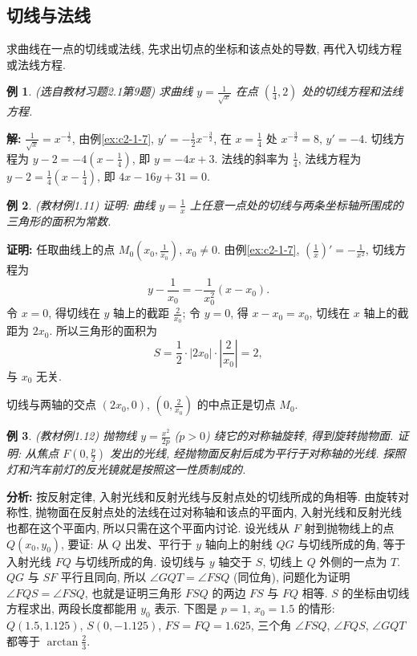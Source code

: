 \documentclass[UTF8,openany]{ctexbook}
\theoremstyle{chinesetextbook}
\newtheorem{example}{例}[section]
\newenvironment{cnproof}{\par\indent\textbf{证明:} \ignorespaces}{\par}
\newenvironment{cnsolution}{\par\indent\textbf{解:} \ignorespaces}{\par}
\begin{document}
\subsection{切线与法线}
求曲线在一点的切线或法线, 先求出切点的坐标和该点处的导数, 再代入切线方程或法线方程.
\begin{example}\label{ex:c2-h1-9}
\textnormal{(选自教材习题2.1第9题)} 求曲线 $\displaystyle y=\frac1{\sqrt x}$ 在点 $\displaystyle\left(\frac14,2\right)$ 处的切线方程和法线方程.
\end{example}
\begin{cnsolution}
$\displaystyle\frac1{\sqrt x}=x^{-\frac12}$, 由例\ref{ex:c2-1-7}, $\displaystyle y'=-\frac12x^{-\frac32}$, 在 $\displaystyle x=\frac14$ 处 $x^{-\frac32}=8$, $y'=-4$. 切线方程为 $\displaystyle y-2=-4\left(x-\frac14\right)$, 即 $y=-4x+3$. 法线的斜率为 $\displaystyle\frac14$, 法线方程为 $\displaystyle y-2=\frac14\left(x-\frac14\right)$, 即 $4x-16y+31=0$.
\end{cnsolution}
\begin{example}\label{ex:c2-1-11}
\textnormal{(教材例1.11)} 证明: 曲线 $\displaystyle y=\frac1x$ 上任意一点处的切线与两条坐标轴所围成的三角形的面积为常数.
\end{example}
\begin{cnproof}
任取曲线上的点 $\displaystyle M_0\left(x_0,\frac1{x_0}\right)$, $x_0\ne0$. 由例\ref{ex:c2-1-7}, $\displaystyle\left(\frac1x\right)'=-\frac1{x^2}$, 切线方程为
\[
y-\frac1{x_0}=-\frac1{x_0^2}(x-x_0).
\]
令 $x=0$, 得切线在 $y$ 轴上的截距 $\displaystyle\frac2{x_0}$; 令 $y=0$, 得 $x-x_0=x_0$, 切线在 $x$ 轴上的截距为 $2x_0$. 所以三角形的面积为
\[
S=\frac12\cdot|2x_0|\cdot\left|\frac2{x_0}\right|=2,
\]
与 $x_0$ 无关.
\end{cnproof}
切线与两轴的交点 $(2x_0,0)$, $\displaystyle\left(0,\frac2{x_0}\right)$ 的中点正是切点 $M_0$.
\begin{example}\label{ex:c2-1-12}
\textnormal{(教材例1.12)} 抛物线 $\displaystyle y=\frac{x^2}{2p}$ ($p>0$) 绕它的对称轴旋转, 得到旋转抛物面. 证明: 从焦点 $\displaystyle F\left(0,\frac p2\right)$ 发出的光线, 经抛物面反射后成为平行于对称轴的光线. 探照灯和汽车前灯的反光镜就是按照这一性质制成的.
\end{example}
\par\indent\textbf{分析:} 按反射定律, 入射光线和反射光线与反射点处的切线所成的角相等. 由旋转对称性, 抛物面在反射点处的法线在过对称轴和该点的平面内, 入射光线和反射光线也都在这个平面内, 所以只需在这个平面内讨论. 设光线从 $F$ 射到抛物线上的点 $Q(x_0,y_0)$, 要证: 从 $Q$ 出发、平行于 $y$ 轴向上的射线 $QG$ 与切线所成的角, 等于入射光线 $FQ$ 与切线所成的角. 设切线与 $y$ 轴交于 $S$, 切线上 $Q$ 外侧的一点为 $T$. $QG$ 与 $SF$ 平行且同向, 所以 $\angle GQT=\angle FSQ$ (同位角), 问题化为证明 $\angle FQS=\angle FSQ$, 也就是证明三角形 $FSQ$ 的两边 $FS$ 与 $FQ$ 相等. $S$ 的坐标由切线方程求出, 两段长度都能用 $y_0$ 表示. 下图是 $p=1$, $x_0=1.5$ 的情形: $Q(1.5,1.125)$, $S(0,-1.125)$, $FS=FQ=1.625$, 三个角 $\angle FSQ$, $\angle FQS$, $\angle GQT$ 都等于 $\displaystyle\arctan\frac23$.
\end{document}
